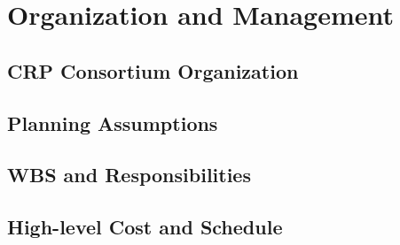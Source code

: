 


\section{Organization and Management}
\label{sec:fddp-crp-org}

\subsection{CRP Consortium Organization}
\label{sec:fddp-crp-org-consortium}


\subsection{Planning Assumptions}
\label{sec:fddp-crp-org-assmp}


\subsection{WBS and Responsibilities}
\label{sec:fddp-crp-org-wbs}

\subsection{High-level Cost and Schedule}
\label{sec:fddp-crp-org-cs}














